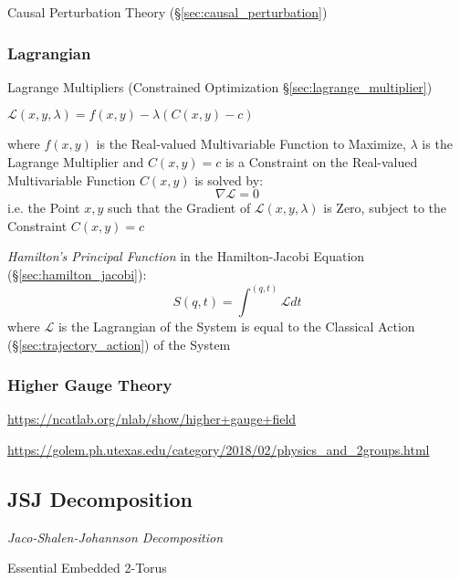 
Causal Perturbation Theory (\S\ref{sec:causal_perturbation})



\subsubsection{Lagrangian}\label{sec:lagrangian}

\fist Lagrange Multipliers (Constrained Optimization
\S\ref{sec:lagrange_multiplier})

$\mathcal{L}(x,y,\lambda) = f(x,y) - \lambda (C(x,y) - c)$

where $f(x,y)$ is the Real-valued Multivariable Function to Maximize, $\lambda$
is the Lagrange Multiplier and $C(x,y) = c$ is a Constraint on the Real-valued
Multivariable Function $C(x,y)$ is solved by:
\[
  \nabla\mathcal{L} = 0
\]
i.e. the Point $x,y$ such that the Gradient of $\mathcal{L}(x,y,\lambda)$ is
Zero, subject to the Constraint $C(x,y) = c$

\emph{Hamilton's Principal Function} in the Hamilton-Jacobi Equation
(\S\ref{sec:hamilton_jacobi}):
\[
  S(q,t) = \int^{(q,t)} \mathcal{L} dt
\]
where $\mathcal{L}$ is the Lagrangian of the System is equal to the Classical
Action (\S\ref{sec:trajectory_action}) of the System



\subsubsection{Higher Gauge Theory}\label{sec:higher_gauge_theory}

\url{https://ncatlab.org/nlab/show/higher+gauge+field}

\url{https://golem.ph.utexas.edu/category/2018/02/physics_and_2groups.html}



\subsection{JSJ Decomposition}\label{sec:jsj_decomposition}

\emph{Jaco-Shalen-Johannson Decomposition}

Essential Embedded 2-Torus



